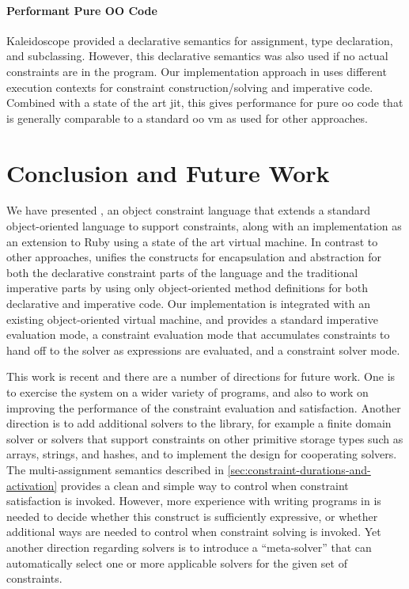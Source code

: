 \paragraph{Performant Pure OO Code}
Kaleidoscope provided a declarative semantics for assignment, type
declaration, and subclassing. However, this declarative semantics was
also used if no actual constraints are in the program. Our
implementation approach in \toolname uses different execution contexts
for constraint construction/solving and imperative code. Combined with
a state of the art \ac{jit}, this gives performance for pure \ac{oo}
code that is generally comparable to a standard \ac{oo} \ac{vm} as used for
other approaches.

\section{Conclusion and Future Work}
\label{sec:conclusion}
We have presented \langname, an object constraint language that extends
a standard object-oriented language to support constraints, along with
an implementation as an extension to Ruby using a state of the art
virtual machine.  In contrast to other approaches, \langname unifies
the constructs for encapsulation and abstraction for both the
declarative constraint parts of the language and the traditional
imperative parts by using only object-oriented method definitions for
both declarative and imperative code.  Our implementation is
integrated with an existing object-oriented virtual machine, and
provides a standard imperative evaluation mode, a constraint
evaluation mode that accumulates constraints to hand off to the solver
as expressions are evaluated, and a constraint solver mode.

This work is recent and there are a number of directions
for future work.  One is to exercise the system on a wider variety of
programs, and also to work on improving the performance of the
constraint evaluation and satisfaction.  Another direction is to add
additional solvers to the library, for example a finite domain solver
or solvers that support constraints on other primitive storage types
such as arrays, strings, and hashes, and to implement the design for
cooperating solvers.  The multi-assignment semantics described in
\autoref{sec:constraint-durations-and-activation} provides a clean and
simple way to control when constraint satisfaction is invoked.
However, more experience with writing programs in \toolname is needed
to decide whether this construct is sufficiently expressive, or
whether additional ways are needed to control when constraint solving
is invoked.  Yet another direction regarding solvers is to introduce a
``meta-solver'' that can automatically select one or more applicable
solvers for the given set of constraints.

